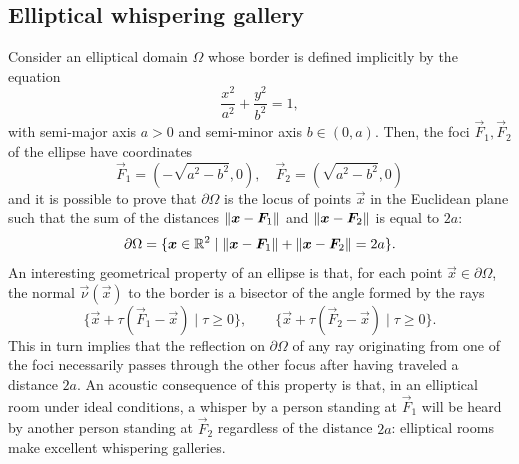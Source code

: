 \subsection*{Elliptical whispering gallery}
Consider an elliptical domain $\Omega$ whose border is defined implicitly
by the equation
\[
\frac{x^2}{a^2} + \frac{y^2}{b^2} = 1,
\]
with semi-major axis $a > 0$ and semi-minor axis $b \in (0,a)$.
Then, the foci $\vec{F}_1, \vec{F}_2$ of the ellipse have coordinates
\[
\vec{F}_1 = (-\sqrt{a^2 - b^2}, 0), \quad \vec{F}_2 = (\sqrt{a^2 - b^2}, 0)
\]
and it is possible to prove that $\partial \Omega$ is the locus
of points $\vec{x}$ in the Euclidean plane such that the sum of the distances
$\left\lVert\bm{x}-\bm{F}_1\right\rVert$ and $\left\lVert\bm{x}-\bm{F}_2\right\rVert$ is equal to $2a$:
\[
\partial\Omega = \{ \bm{x} \in \mathbb{R}^2 \mid
\left\lVert\bm{x}-\bm{F}_1\right\rVert + \left\lVert\bm{x}-\bm{F}_2\right\rVert = 2a \}.
\]
An interesting geometrical property of an ellipse is that, for each point
$\vec{x} \in \partial\Omega$, the normal $\vec{\nu}(\vec{x})$ to the
border is a bisector of the angle formed by the rays
\[
\{ \vec{x} + \tau (\vec{F}_1 - \vec{x}) \mid \tau \geq 0 \},
\qquad
\{ \vec{x} + \tau (\vec{F}_2 - \vec{x}) \mid \tau \geq 0 \}.
\]
This in turn implies that the reflection on $\partial\Omega$ of any ray
originating from one of the foci necessarily passes through the other
focus after having traveled a distance $2a$.
An acoustic consequence of this property is that, in an elliptical room
under ideal conditions, a whisper by a person standing at $\vec{F}_1$
will be heard by another person standing at $\vec{F}_2$ regardless
of the distance $2a$: elliptical rooms make excellent whispering galleries.

